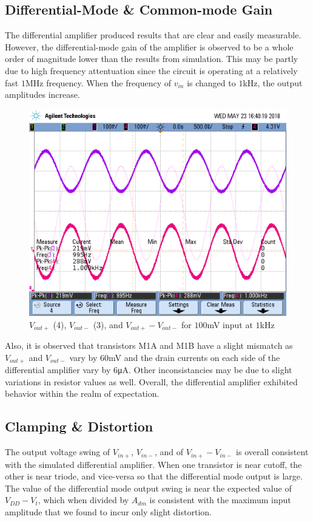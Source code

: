 \subsection{Differential-Mode \& Common-mode Gain}
The differential amplifier produced results that are clear and easily measurable.
However, the differential-mode gain of the amplifier is observed to be a whole order of magnitude lower than the results from simulation.
This may be partly due to high frequency attentuation since the circuit is operating at a relatively fast $1$\si{\mega\hertz} frequency. 
When the frequency of $v_{in}$ is changed to $1$\si{\kilo\hertz}, the output amplitudes increase.

\FloatBarrier

\begin{figure}[h!]
	\centering
	\includegraphics[scale=0.5]{./images/scope_2}
	\caption{$V_{out+}$ (4), $V_{out-}$ (3), and $V_{out+} - V_{out-}$ for $100$\si{\milli\volt} input at $1$\si{\kilo\hertz}}
	\label{fig:scope_2}
\end{figure}

\FloatBarrier

Also, it is observed that transistors M1A and M1B have a slight mismatch as $V_{out+}$ and $V_{out-}$ vary by $60$\si{\milli\volt} and the drain currents on each side of the differential amplifier vary by $6$\si{\micro\ampere}.
Other inconsistancies may be due to slight variations in resistor values as well.
Overall, the differential amplifier exhibited behavior within the realm of expectation. \\



\subsection{Clamping \& Distortion}
The output voltage swing of $V_{in+}$, $V_{in-}$, and of $V_{in+} - V_{in-}$ is overall consistent with the simulated differential amplifier.
When one transistor is near cutoff, the other is near triode, and vice-versa so that the differential mode output is large.
The value of the differential mode output swing is near the expected value of $V_{DD} - V_{t}$, which when divided by $A_{dm}$ is consistent with the maximum input amplitude that we found to incur only slight distortion.
